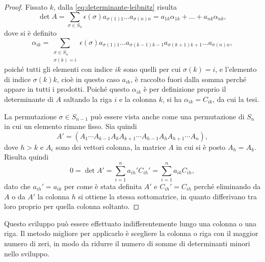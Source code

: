 \begin{proof}
	Fissato $k$, dalla \eqref{eq:determinante-leibnitz} risulta
	\begin{equation*}
		\det A=\sum_{\sigma\in S_n}\epsilon(\sigma)a_{\sigma(1)1}\dots a_{\sigma(n)n}=a_{1k}\alpha_{1k}+\dots+a_{nk}\alpha_{nk},
	\end{equation*}
	dove si è definito
	\begin{equation*}
		\alpha_{ik}=\sum_{\substack{\sigma\in S_n\\\sigma(k)=i}}\epsilon(\sigma)a_{\sigma(1)1}\dots a_{\sigma(k-1)k-1}a_{\sigma(k+1)k+1}\dots a_{\sigma(n)n},
	\end{equation*}
	poiché tutti gli elementi con indice $ik$ sono quelli per cui $\sigma(k)=i$, e l'elemento di indice $\sigma(k)k$, cioè in questo caso $a_{ik}$, è raccolto fuori dalla somma perché appare in tutti i prodotti.
	Poiché questo $\alpha_{ik}$ è per definizione proprio il determinante di $A$ saltando la riga $i$ e la colonna $k$, si ha $\alpha_{ik}=C_{ik}$, da cui la tesi.

	La permutazione $\sigma\in S_{n-1}$ può essere vista anche come una permutazione di $S_n$ in cui un elemento rimane fisso. Sia quindi
	\begin{equation*}
		A'=(A_1\cdots A_{k-1}A_kA_{k+1}\cdots A_{h-1}A_hA_{h+1}\cdots A_n),
	\end{equation*}
	dove $h>k$ e $A_i$ sono dei vettori colonna, la matrice $A$ in cui si è posto $A_h=A_k$. Risulta quindi
	\begin{equation*}
		0=\det A'=\sum_{i=1}^na_{ih}'C_{ih}'=\sum_{i=1}^na_{ik}C_{ih},
	\end{equation*}
	dato che $a_{ih}'=a_{ik}$ per come è stata definita $A'$ e $C_{ih}'=C_{ih}$ perché eliminando da $A$ o da $A'$ la colonna $h$ si ottiene la stessa sottomatrice, in quanto differivano tra loro proprio per quella colonna soltanto.
\end{proof}
Questo sviluppo può essere effettuato indifferentemente lungo una colonna o una riga.
Il metodo migliore per applicarlo è scegliere la colonna o riga con il maggior numero di zeri, in modo da ridurre il numero di somme di determinanti minori nello sviluppo.

